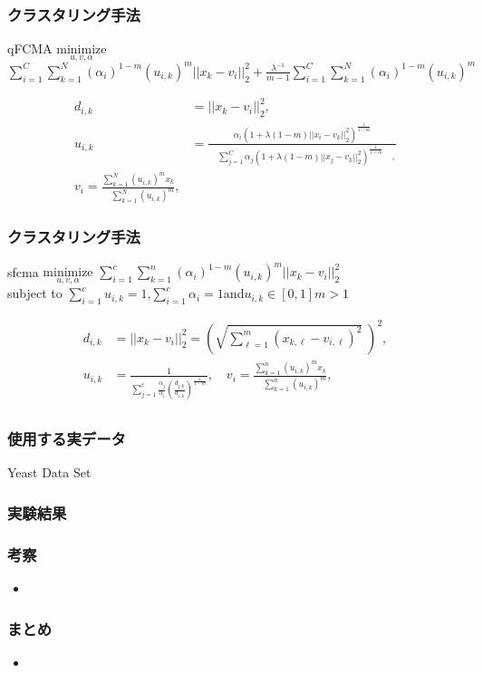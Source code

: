 \documentclass[13pt,dvipdfmx]{beamer}
\begin{document}
\begin{frame}\frametitle{\Large クラスタリング手法}
 \begin{block}{qFCMA}
  $\underset{u,v,\alpha}{\text{minimize}}$
  $\sum_{i=1}^C\sum_{k=1}^N(\alpha_{i})^{1-m}(u_{i,k})^m||x_k-v_i||_2^2+\frac{\lambda^{-1}}{m-1}\sum_{i=1}^C\sum_{k=1}^N(\alpha_{i})^{1-m}(u_{i,k})^m$\centering\\
 \end{block}
 \begin{align*}
  d_{i,k}&=||x_{k}-v_{i}||_{2}^2, \\
  u_{i,k}&=\frac{\alpha_{i}(1+\lambda(1-m)||x_i-v_k||_2^2)^\frac{1}{1-m}}{\quad\sum_{j=1}^C\alpha_{j}(1+\lambda(1-m)||x_j-v_k||_2^2)^\frac{1}{1-m}\quad,}\\
  v_{i}=\frac{\sum_{k=1}^N(u_{i,k})^mx_{k}}{\quad\sum_{k=1}^N(u_{i,k})^{m}},
 \end{align*}
\end{frame}

\begin{frame}\frametitle{\large クラスタリング手法}
 \begin{block}{sfcma}
  $\underset{u,v,\alpha}{\text{minimize}}$
  $\sum_{i=1}^c\sum_{k=1}^n(\alpha_{i})^{1-m}(u_{i,k})^m||x_k-v_i||_2^2$\\
  subject \; to \; $\sum_{i=1}^cu_{i,k}=1$\;,\;$\sum_{i=1}^c\alpha_{i}=1$\;and\;$u_{i,k}\in[0,1]$\quad$m>1$
 \end{block}
 \begin{align*}
  d_{i,k}&=||x_{k}-v_{i}||_{2}^2=\left(\sqrt{\sum_{\ell=1}^m (x_{k,\ell}-v_{i,\ell})^2}\;\right)^2,\\
  u_{i,k}&=\frac{1}{\sum_{j=1}^c\frac{\alpha_{j}}{\alpha_{i}}\left(\frac{d_{j,k}}{d_{i,k}}\right)^\frac{1}{1-m}},\quad
  v_{i}=\frac{\sum_{k=1}^n(u_{i,k})^mx_{k}}{\quad\sum_{k=1}^n(u_{i,k})^{m}},\\
 \end{align*}
\end{frame}


\begin{frame}\frametitle{使用する実データ}
\begin{center}
{\Large Yeast Data Set}
\begin{figure}
\end{figure}
\end{center}
\end{frame}

\begin{frame}\frametitle{実験結果}
\begin{center}
{\Large}
\begin{figure}
\end{figure}
\end{center}
\end{frame}

\begin{frame}\frametitle{考察}
\begin{itemize}
 \item 
\end{itemize}
\end{frame}

\begin{frame}\frametitle{まとめ}
\begin{itemize}
 \item 
\end{itemize}
\end{frame}
\end{document}

